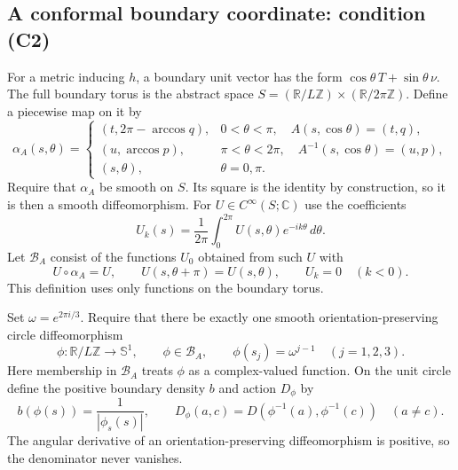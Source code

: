 \documentclass[11pt]{article}
\theoremstyle{remark}
\newcommand{\Sone}{\mathbb S^1}
\newcommand{\BA}{\mathcal B_A}
\newcommand{\dd}{\,d}
\begin{document}
\subsection{A conformal boundary coordinate: condition (C2)}\label{subsec:c2}
For a metric inducing $h$, a boundary unit vector has the form
$\cos\theta\,T+\sin\theta\,\nu$.
The full boundary torus is the abstract space
$S=(\mathbb R/L\mathbb Z)\times(\mathbb R/2\pi\mathbb Z)$.
Define a piecewise map on it by
\begin{equation}\label{eq:full-lift}
 \alpha_A(s,\theta)=
 \begin{cases}
 (t,2\pi-\arccos q), &0<\theta<\pi,
       \quad A(s,\cos\theta)=(t,q),\\
 (u,\arccos p), &\pi<\theta<2\pi,
       \quad A^{-1}(s,\cos\theta)=(u,p),\\
 (s,\theta), &\theta=0,\pi.
 \end{cases}
\end{equation}
Require that $\alpha_A$ be smooth on $S$. Its square is the identity by
construction, so it is then a smooth diffeomorphism.
For $U\in C^\infty(S;\mathbb C)$ use the coefficients
\[
 U_k(s)=\frac1{2\pi}\int_0^{2\pi}U(s,\theta)e^{-ik\theta}\dd\theta.
\]
Let $\BA$ consist of the functions $U_0$ obtained from such $U$ with
\begin{equation}\label{eq:boundary-fourier}
 U\circ\alpha_A=U,\qquad
 U(s,\theta+\pi)=U(s,\theta),\qquad
 U_k=0\quad(k<0).
\end{equation}
This definition uses only functions on the boundary torus.

Set $\omega=e^{2\pi i/3}$. Require that there be exactly one smooth
orientation-preserving circle diffeomorphism
\begin{equation}\label{eq:phi}
 \phi:\mathbb R/L\mathbb Z\longrightarrow\Sone,
 \qquad \phi\in\BA,\qquad \phi(s_j)=\omega^{j-1}
       \quad(j=1,2,3).
\end{equation}
Here membership in $\BA$ treats $\phi$ as a complex-valued function.
On the unit circle define the positive boundary density $b$ and action
$D_\phi$ by
\begin{equation}\label{eq:boundary-density}
 b(\phi(s))=\frac1{|\phi_s(s)|},\qquad
 D_\phi(a,c)=D(\phi^{-1}(a),\phi^{-1}(c))\quad(a\ne c).
\end{equation}
The angular derivative of an orientation-preserving diffeomorphism is
positive, so the denominator never vanishes.
\end{document}
